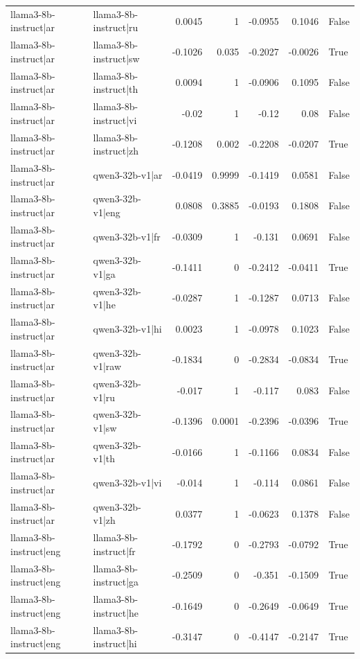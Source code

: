 \begin{table}
\begin{tabular}{l l r r r r l}
llama3-8b-instruct|ar & llama3-8b-instruct|ru & 0.0045 & 1 & -0.0955 & 0.1046 & False \\
llama3-8b-instruct|ar & llama3-8b-instruct|sw & -0.1026 & 0.035 & -0.2027 & -0.0026 & True \\
llama3-8b-instruct|ar & llama3-8b-instruct|th & 0.0094 & 1 & -0.0906 & 0.1095 & False \\
llama3-8b-instruct|ar & llama3-8b-instruct|vi & -0.02 & 1 & -0.12 & 0.08 & False \\
llama3-8b-instruct|ar & llama3-8b-instruct|zh & -0.1208 & 0.002 & -0.2208 & -0.0207 & True \\
llama3-8b-instruct|ar & qwen3-32b-v1|ar & -0.0419 & 0.9999 & -0.1419 & 0.0581 & False \\
llama3-8b-instruct|ar & qwen3-32b-v1|eng & 0.0808 & 0.3885 & -0.0193 & 0.1808 & False \\
llama3-8b-instruct|ar & qwen3-32b-v1|fr & -0.0309 & 1 & -0.131 & 0.0691 & False \\
llama3-8b-instruct|ar & qwen3-32b-v1|ga & -0.1411 & 0 & -0.2412 & -0.0411 & True \\
llama3-8b-instruct|ar & qwen3-32b-v1|he & -0.0287 & 1 & -0.1287 & 0.0713 & False \\
llama3-8b-instruct|ar & qwen3-32b-v1|hi & 0.0023 & 1 & -0.0978 & 0.1023 & False \\
llama3-8b-instruct|ar & qwen3-32b-v1|raw & -0.1834 & 0 & -0.2834 & -0.0834 & True \\
llama3-8b-instruct|ar & qwen3-32b-v1|ru & -0.017 & 1 & -0.117 & 0.083 & False \\
llama3-8b-instruct|ar & qwen3-32b-v1|sw & -0.1396 & 0.0001 & -0.2396 & -0.0396 & True \\
llama3-8b-instruct|ar & qwen3-32b-v1|th & -0.0166 & 1 & -0.1166 & 0.0834 & False \\
llama3-8b-instruct|ar & qwen3-32b-v1|vi & -0.014 & 1 & -0.114 & 0.0861 & False \\
llama3-8b-instruct|ar & qwen3-32b-v1|zh & 0.0377 & 1 & -0.0623 & 0.1378 & False \\
llama3-8b-instruct|eng & llama3-8b-instruct|fr & -0.1792 & 0 & -0.2793 & -0.0792 & True \\
llama3-8b-instruct|eng & llama3-8b-instruct|ga & -0.2509 & 0 & -0.351 & -0.1509 & True \\
llama3-8b-instruct|eng & llama3-8b-instruct|he & -0.1649 & 0 & -0.2649 & -0.0649 & True \\
llama3-8b-instruct|eng & llama3-8b-instruct|hi & -0.3147 & 0 & -0.4147 & -0.2147 & True \\

\end{tabular}
\end{table}
